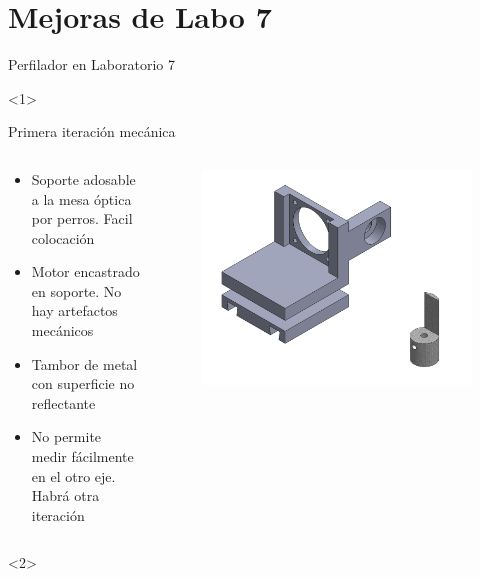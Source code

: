\section{Mejoras de Labo 7}

\begin{frame}{Perfilador en Laboratorio 7}
    \begin{onlyenv}<1>
        
    
    Primera iteración mecánica
    \begin{columns}[c]
        \begin{column}{0.4\textwidth}
            \begin{itemize}
                \item Soporte adosable a la mesa óptica por perros. Facil colocación
                \item Motor encastrado en soporte. No hay artefactos mecánicos
                \item Tambor de metal con superficie no reflectante
                \item No permite medir fácilmente en el otro eje. Habrá otra iteración
            \end{itemize}
        \end{column}
        \begin{column}{0.5\textwidth}
            \begin{figure}
                \centering
                \includegraphics[width=\textwidth]{fig/perfilador/soporte_labo7_1}
             
                \label{fig:soporte_labo7}
            \end{figure}
        \end{column}
    \end{columns}
    \end{onlyenv}
    \begin{onlyenv}<2>
        

\end{onlyenv}
\end{frame}
